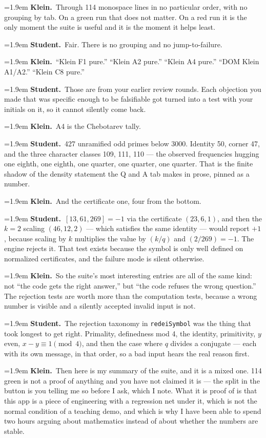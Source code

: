 \documentclass[11pt]{article}
\newcommand{\Stu}[1]{\par\smallskip\noindent\hangindent=1.9em\hangafter=1%
  \textcolor{stucol}{\textbf{Student.}}~#1\par}
\newcommand{\Kle}[1]{\par\smallskip\noindent\hangindent=1.9em\hangafter=1%
  \textcolor{klecol}{\textbf{Klein.}}~#1\par}
\newcommand{\walkbeat}[1]{\par\smallskip{\centering\small\itshape\textcolor{beatgray}{#1}\par}\smallskip}
\begin{document}
\Kle{Through 114 monospace lines in no particular order, with no grouping by tab. On a green run that does not matter. On a red run it is the only moment the suite is useful and it is the moment it helps least.}

\Stu{Fair. There is no grouping and no jump-to-failure.}

\walkbeat{Klein runs his finger down the list and stops partway.}

\Kle{``Klein F1 pure.'' ``Klein A2 pure.'' ``Klein A4 pure.'' ``DOM Klein A1/A2.'' ``Klein C8 pure.''}

\Stu{Those are from your earlier review rounds. Each objection you made that was specific enough to be falsifiable got turned into a test with your initials on it, so it cannot silently come back.}

\Kle{A4 is the Chebotarev tally.}

\Stu{427 unramified odd primes below 3000. Identity 50, corner 47, and the three character classes 109, 111, 110 --- the observed frequencies hugging one eighth, one eighth, one quarter, one quarter, one quarter. That is the finite shadow of the density statement the Q and A tab makes in prose, pinned as a number.}

\Kle{And the certificate one, four from the bottom.}

\Stu{$[13,61,269] = -1$ via the certificate $(23,6,1)$, and then the $k=2$ scaling $(46,12,2)$ --- which satisfies the same identity --- would report $+1$, because scaling by $k$ multiplies the value by $(k/q)$ and $(2/269) = -1$. The engine rejects it. That test exists because the symbol is only well defined on normalized certificates, and the failure mode is silent otherwise.}

\Kle{So the suite's most interesting entries are all of the same kind: not ``the code gets the right answer,'' but ``the code refuses the wrong question.'' The rejection tests are worth more than the computation tests, because a wrong number is visible and a silently accepted invalid input is not.}

\Stu{The rejection taxonomy in \texttt{redeiSymbol} was the thing that took longest to get right. Primality, definedness mod 4, the identity, primitivity, $y$ even, $x - y \equiv 1 \pmod 4$, and then the case where $q$ divides a conjugate --- each with its own message, in that order, so a bad input hears the real reason first.}

\Kle{Then here is my summary of the suite, and it is a mixed one. 114 green is not a proof of anything and you have not claimed it is --- the split in the button is you telling me so before I ask, which I note. What it is proof of is that this app is a piece of engineering with a regression net under it, which is not the normal condition of a teaching demo, and which is why I have been able to spend two hours arguing about mathematics instead of about whether the numbers are stable.}
\end{document}
